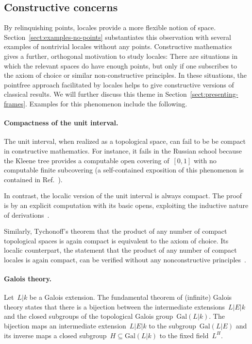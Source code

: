 \documentclass{ws-rv9x6}
\newcommand{\Gal}{\mathrm{Gal}}
\renewcommand{\_}{\mathpunct{.}}
\newcommand{\?}{\,{:}\,}
\begin{document}
\subsection{Constructive concerns}

By relinquishing points, locales provide a more flexible notion of space.
Section~\ref{sect:examples-no-points} substantiates this observation
with several examples of nontrivial locales without any points. Constructive
mathematics gives a further, orthogonal motivation to study locales: There are
situations in which the relevant spaces do have enough points, but only if one
subscribes to the axiom of choice or similar non-constructive principles. In
these situations, the pointfree approach facilitated by locales helps to give
constructive versions of classical results. We will further discuss this theme
in Section~\ref{sect:presenting-frames}. Examples for this phenomenon include
the following.

\paragraph{Compactness of the unit interval.} The unit interval, when realized
as a topological space, can fail to be be compact in constructive
mathematics. For instance, it fails in the Russian school because the Kleene
tree provides a computable open covering of~$[0,1]$ with no computable finite
subcovering (a self-contained exposition of this phenomenon is contained in
Ref.~).

In contrast, the localic version of the unit interval is always compact. The
proof is by an explicit computation with its basic opens, exploiting the inductive
nature of derivations~\cite{cederquist-negri:heine-borel}.

Similarly, Tychonoff's theorem that the product of any number of compact
topological spaces is again compact is equivalent to the axiom of choice. Its
localic counterpart, the statement that the product of any number of compact
locales is again compact, can be verified without any nonconstructive
principles~\cite{vickers:tychonoff}.

\paragraph{Galois theory.} Let~$L|k$ be a Galois extension. The
fundamental theorem of (infinite) Galois theory states that there is a bijection between
the intermediate extensions~$L|E|k$ and the closed subgroups of the topological
Galois group~$\Gal(L|k)$. The bijection maps an intermediate extension~$L|E|k$
to the subgroup~$\Gal(L|E)$ and its inverse maps a closed subgroup~$H \subseteq
\Gal(L|k)$ to the fixed field~$L^H$.
\end{document}

